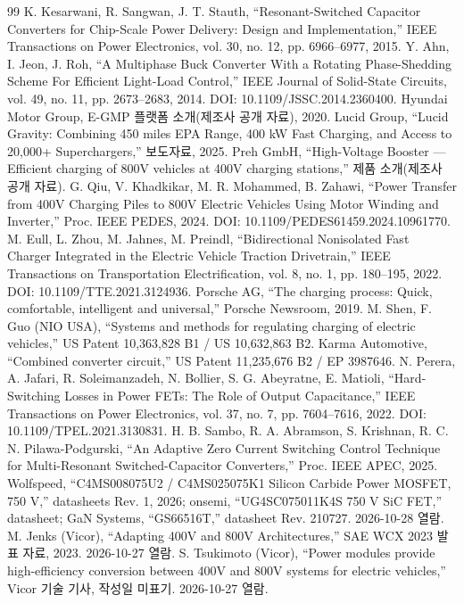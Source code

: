 \begin{thebibliography}{99}
 K. Kesarwani, R. Sangwan, J. T. Stauth, “Resonant-Switched Capacitor Converters for Chip-Scale Power Delivery: Design and Implementation,” IEEE Transactions on Power Electronics, vol. 30, no. 12, pp. 6966–6977, 2015.
 Y. Ahn, I. Jeon, J. Roh, “A Multiphase Buck Converter With a Rotating Phase-Shedding Scheme For Efficient Light-Load Control,” IEEE Journal of Solid-State Circuits, vol. 49, no. 11, pp. 2673–2683, 2014. DOI: 10.1109/JSSC.2014.2360400.
 Hyundai Motor Group, E-GMP 플랫폼 소개(제조사 공개 자료), 2020.
 Lucid Group, “Lucid Gravity: Combining 450 miles EPA Range, 400 kW Fast Charging, and Access to 20,000+ Superchargers,” 보도자료, 2025.
 Preh GmbH, “High-Voltage Booster — Efficient charging of 800V vehicles at 400V charging stations,” 제품 소개(제조사 공개 자료).
 G. Qiu, V. Khadkikar, M. R. Mohammed, B. Zahawi, “Power Transfer from 400V Charging Piles to 800V Electric Vehicles Using Motor Winding and Inverter,” Proc. IEEE PEDES, 2024. DOI: 10.1109/PEDES61459.2024.10961770.
 M. Eull, L. Zhou, M. Jahnes, M. Preindl, “Bidirectional Nonisolated Fast Charger Integrated in the Electric Vehicle Traction Drivetrain,” IEEE Transactions on Transportation Electrification, vol. 8, no. 1, pp. 180–195, 2022. DOI: 10.1109/TTE.2021.3124936.
 Porsche AG, “The charging process: Quick, comfortable, intelligent and universal,” Porsche Newsroom, 2019.
 M. Shen, F. Guo (NIO USA), “Systems and methods for regulating charging of electric vehicles,” US Patent 10,363,828 B1 / US 10,632,863 B2.
 Karma Automotive, “Combined converter circuit,” US Patent 11,235,676 B2 / EP 3987646.
 N. Perera, A. Jafari, R. Soleimanzadeh, N. Bollier, S. G. Abeyratne, E. Matioli, “Hard-Switching Losses in Power FETs: The Role of Output Capacitance,” IEEE Transactions on Power Electronics, vol. 37, no. 7, pp. 7604–7616, 2022. DOI: 10.1109/TPEL.2021.3130831.
 H. B. Sambo, R. A. Abramson, S. Krishnan, R. C. N. Pilawa-Podgurski, “An Adaptive Zero Current Switching Control Technique for Multi-Resonant Switched-Capacitor Converters,” Proc. IEEE APEC, 2025.
 Wolfspeed, “C4MS008075U2 / C4MS025075K1 Silicon Carbide Power MOSFET, 750 V,” datasheets Rev. 1, 2026; onsemi, “UG4SC075011K4S 750 V SiC FET,” datasheet; GaN Systems, “GS66516T,” datasheet Rev. 210727. 2026-10-28 열람.
 M. Jenks (Vicor), “Adapting 400V and 800V Architectures,” SAE WCX 2023 발표 자료, 2023. 2026-10-27 열람.
 S. Tsukimoto (Vicor), “Power modules provide high-efficiency conversion between 400V and 800V systems for electric vehicles,” Vicor 기술 기사, 작성일 미표기. 2026-10-27 열람.

\end{thebibliography}
